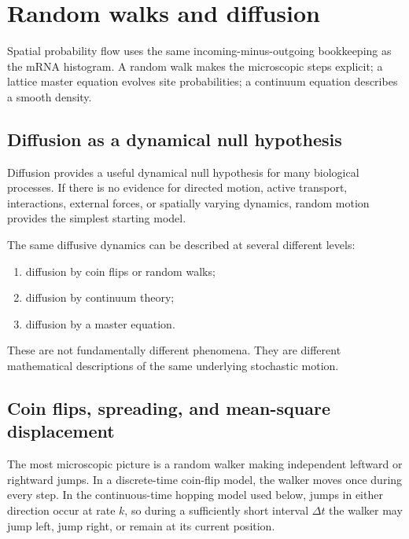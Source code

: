 \clearpage
\section{Random walks and diffusion}
\label{sec:diffusion}
Spatial probability flow uses the same incoming-minus-outgoing bookkeeping as the mRNA histogram.
A random walk makes the microscopic steps explicit; a lattice master equation evolves site probabilities; a continuum equation describes a smooth density.
\subsection{Diffusion as a dynamical null hypothesis}
\label{sec:diff-null}



Diffusion provides a useful dynamical null hypothesis for many biological processes.
If there is no evidence for directed motion, active transport, interactions, external forces, or spatially varying dynamics, random motion provides the simplest starting model.

The same diffusive dynamics can be described at several different levels:

\begin{enumerate}
    \item diffusion by coin flips or random walks;
    \item diffusion by continuum theory;
    \item diffusion by a master equation.
\end{enumerate}
These are not fundamentally different phenomena.
They are different mathematical descriptions of the same underlying stochastic motion.



\subsection{Coin flips, spreading, and mean-square displacement}
\label{sec:coin}


The most microscopic picture is a random walker making independent leftward or rightward jumps.
In a discrete-time coin-flip model, the walker moves once during every step.
In the continuous-time hopping model used below, jumps in either direction occur at rate $k$, so during a sufficiently short interval $\Delta t$ the walker may jump left, jump right, or remain at its current position.

